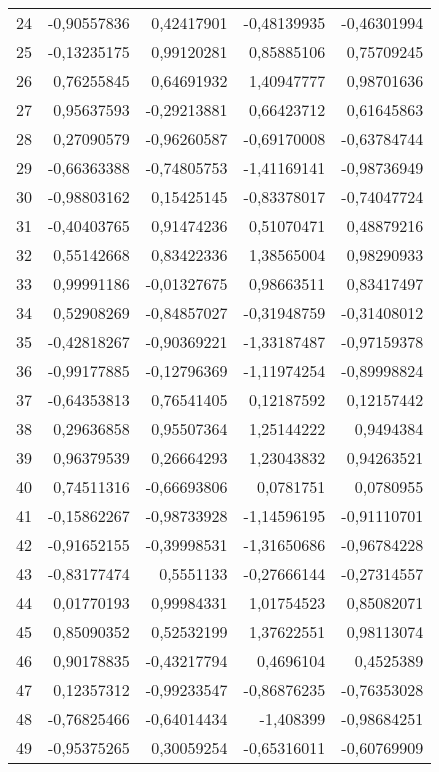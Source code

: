 \begin{longtable}{lrrrr}
 24 & -0,90557836 & 0,42417901 & -0,48139935 & -0,46301994 \\
 25 & -0,13235175 & 0,99120281 & 0,85885106 & 0,75709245 \\
 26 & 0,76255845 & 0,64691932 & 1,40947777 & 0,98701636 \\
 27 & 0,95637593 & -0,29213881 & 0,66423712 & 0,61645863 \\
 28 & 0,27090579 & -0,96260587 & -0,69170008 & -0,63784744 \\
 29 & -0,66363388 & -0,74805753 & -1,41169141 & -0,98736949 \\
 30 & -0,98803162 & 0,15425145 & -0,83378017 & -0,74047724 \\
 31 & -0,40403765 & 0,91474236 & 0,51070471 & 0,48879216 \\
 32 & 0,55142668 & 0,83422336 & 1,38565004 & 0,98290933 \\
 33 & 0,99991186 & -0,01327675 & 0,98663511 & 0,83417497 \\
 34 & 0,52908269 & -0,84857027 & -0,31948759 & -0,31408012 \\
 35 & -0,42818267 & -0,90369221 & -1,33187487 & -0,97159378 \\
 36 & -0,99177885 & -0,12796369 & -1,11974254 & -0,89998824 \\
 37 & -0,64353813 & 0,76541405 & 0,12187592 & 0,12157442 \\
 38 & 0,29636858 & 0,95507364 & 1,25144222 &  0,9494384 \\
 39 & 0,96379539 & 0,26664293 & 1,23043832 & 0,94263521 \\
 40 & 0,74511316 & -0,66693806 &  0,0781751 &  0,0780955 \\
 41 & -0,15862267 & -0,98733928 & -1,14596195 & -0,91110701 \\
 42 & -0,91652155 & -0,39998531 & -1,31650686 & -0,96784228 \\
 43 & -0,83177474 &  0,5551133 & -0,27666144 & -0,27314557 \\
 44 & 0,01770193 & 0,99984331 & 1,01754523 & 0,85082071 \\
 45 & 0,85090352 & 0,52532199 & 1,37622551 & 0,98113074 \\
 46 & 0,90178835 & -0,43217794 &  0,4696104 &  0,4525389 \\
 47 & 0,12357312 & -0,99233547 & -0,86876235 & -0,76353028 \\
 48 & -0,76825466 & -0,64014434 &  -1,408399 & -0,98684251 \\
 49 & -0,95375265 & 0,30059254 & -0,65316011 & -0,60769909 \\

\end{longtable}
